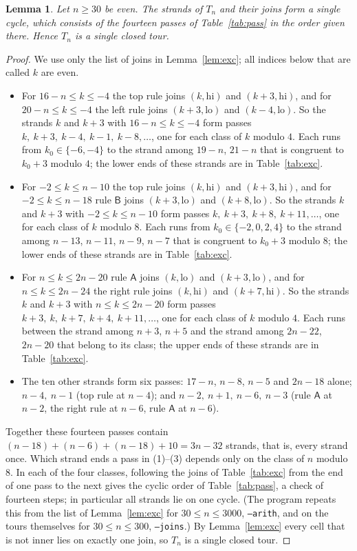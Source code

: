 \documentclass[11pt]{amsart}
\newtheorem{lemma}[theorem]{Lemma}
\theoremstyle{remark}
\newcommand{\lo}{\mathrm{lo}}
\newcommand{\hi}{\mathrm{hi}}
\begin{document}
\begin{lemma}\label{lem:step}
Let $n\ge30$ be even. The strands of $T_n$ and their joins form a single cycle, which consists of the fourteen
passes of Table~\ref{tab:pass} in the order given there. Hence $T_n$ is a single closed tour.
\end{lemma}
\begin{proof}
We use only the list of joins in Lemma~\ref{lem:exc}; all indices below that are called $k$ are even.
\begin{itemize}
\item[(1)] For $16-n\le k\le-4$ the top rule joins $(k,\hi)$ and $(k+3,\hi)$, and for $20-n\le k\le-4$ the left rule joins
$(k+3,\lo)$ and $(k-4,\lo)$. So the strands $k$ and $k+3$ with $16-n\le k\le-4$ form passes $k,\ k+3,\ k-4,\ k-1,\ k-8,\dots$,
one for each class of $k$ modulo $4$. Each runs from $k_0\in\{-6,-4\}$ to the strand among $19-n$, $21-n$ that is congruent
to $k_0+3$ modulo $4$; the lower ends of these strands are in Table~\ref{tab:exc}.
\item[(2)] For $-2\le k\le n-10$ the top rule joins $(k,\hi)$ and $(k+3,\hi)$, and for $-2\le k\le n-18$ rule $\mathsf B$
joins $(k+3,\lo)$ and $(k+8,\lo)$. So the strands $k$ and $k+3$ with $-2\le k\le n-10$ form passes
$k,\ k+3,\ k+8,\ k+11,\dots$, one for each class of $k$ modulo $8$. Each runs from $k_0\in\{-2,0,2,4\}$ to the strand among
$n-13$, $n-11$, $n-9$, $n-7$ that is congruent to $k_0+3$ modulo $8$; the lower ends of these strands are in
Table~\ref{tab:exc}.
\item[(3)] For $n\le k\le 2n-20$ rule $\mathsf A$ joins $(k,\lo)$ and $(k+3,\lo)$, and for $n\le k\le 2n-24$ the right rule
joins $(k,\hi)$ and $(k+7,\hi)$. So the strands $k$ and $k+3$ with $n\le k\le 2n-20$ form passes
$k+3,\ k,\ k+7,\ k+4,\ k+11,\dots$, one for each class of $k$ modulo $4$. Each runs between the strand among $n+3$, $n+5$
and the strand among $2n-22$, $2n-20$ that belong to its class; the upper ends of these strands are in Table~\ref{tab:exc}.
\item[(4)] The ten other strands form six passes: $17-n$, $n-8$, $n-5$ and $2n-18$ alone; $n-4,\ n-1$ (top rule at $n-4$);
and $n-2,\ n+1,\ n-6,\ n-3$ (rule $\mathsf A$ at $n-2$, the right rule at $n-6$, rule $\mathsf A$ at $n-6$).
\end{itemize}
Together these fourteen passes contain $(n-18)+(n-6)+(n-18)+10=3n-32$ strands, that is, every strand once. Which strand
ends a pass in (1)--(3) depends only on the class of $n$ modulo $8$. In each of the four classes, following the joins of
Table~\ref{tab:exc} from the end of one pass to the next gives the cyclic order of Table~\ref{tab:pass}, a check of fourteen
steps; in particular all strands lie on one cycle. (The program repeats this from the list of Lemma~\ref{lem:exc} for
$30\le n\le3000$, \texttt{--arith}, and on the tours themselves for $30\le n\le300$, \texttt{--joins}.) By
Lemma~\ref{lem:exc} every cell that is not inner lies on exactly one join, so $T_n$ is a single closed tour.
\end{proof}
\end{document}
